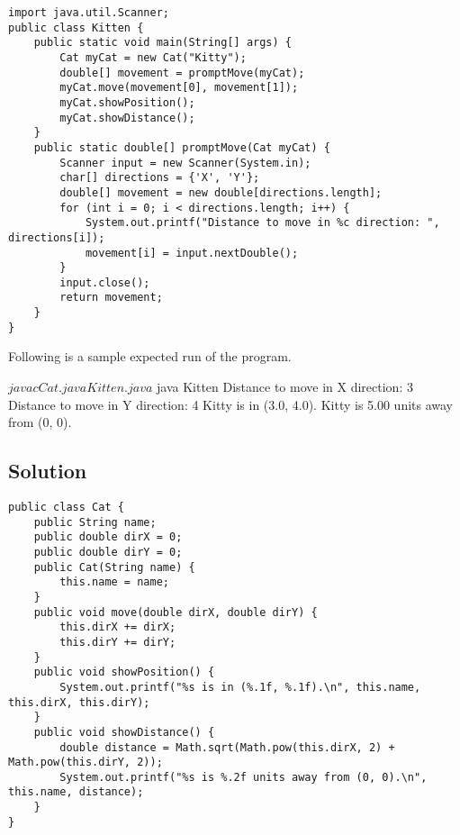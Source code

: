 \documentclass[12pt,letterpaper,twoside]{article}
\begin{document}
\lstset{caption=}
\lstset{language=Java,tabsize=4}
\begin{lstlisting}
import java.util.Scanner;
public class Kitten {
	public static void main(String[] args) {
		Cat myCat = new Cat("Kitty");
		double[] movement = promptMove(myCat);
		myCat.move(movement[0], movement[1]);
		myCat.showPosition();
		myCat.showDistance();
	}
	public static double[] promptMove(Cat myCat) {
		Scanner input = new Scanner(System.in);
		char[] directions = {'X', 'Y'};
		double[] movement = new double[directions.length];
		for (int i = 0; i < directions.length; i++) {
			System.out.printf("Distance to move in %c direction: ", directions[i]);
			movement[i] = input.nextDouble();
		}
		input.close();
		return movement;
	}
}
\end{lstlisting}

\newpage

Following is a sample expected run of the program.

\begin{terminal}
$ javac Cat.java Kitten.java
$ java Kitten
Distance to move in X direction: 3
Distance to move in Y direction: 4
Kitty is in (3.0, 4.0).
Kitty is 5.00 units away from (0, 0).
\end{terminal}

\subsection*{Solution}

\lstset{language=Java,tabsize=4}
\begin{lstlisting}
public class Cat {
	public String name;
	public double dirX = 0;
	public double dirY = 0;
	public Cat(String name) {
		this.name = name;
	}
	public void move(double dirX, double dirY) {
		this.dirX += dirX;
		this.dirY += dirY;
	}
	public void showPosition() {
		System.out.printf("%s is in (%.1f, %.1f).\n", this.name, this.dirX, this.dirY);
	}
	public void showDistance() {
		double distance = Math.sqrt(Math.pow(this.dirX, 2) + Math.pow(this.dirY, 2));
		System.out.printf("%s is %.2f units away from (0, 0).\n", this.name, distance);
	}
}
\end{lstlisting}
\end{document}
